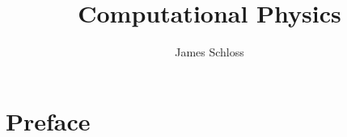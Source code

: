 \documentclass[11pt]{book}
\title{\textbf{Computational Physics}}
\author{James Schloss}
\date{}
\begin{document}
\maketitle

\section*{Preface}



\end{document}
